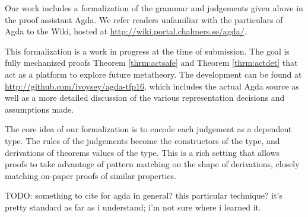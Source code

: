 Our work includes a formalization of the grammar and judgements given above
in the proof assistant Agda. We refer readers unfamiliar with the
particulars of Agda to the Wiki, hosted
at \url{http://wiki.portal.chalmers.se/agda/}.

This formalization is a work in progress at the time of submission. The
goal is fully mechanized proofs Theorem \ref{thrm:actsafe} and
Theorem \ref{thrm:actdet} that act as a platform to explore future
metatheory. The development can be found at
\url{http://github.com/ivoysey/agda-tfp16}, which includes the actual Agda
source as well as a more detailed discussion of the various representation
decisions and assumptions made.

The core idea of our formalization is to encode each judgement as a
dependent type. The rules of the judgements become the constructors of the
type, and derivations of theorems values of the type. This is a rich
setting that allows proofs to take advantage of pattern matching on the
shape of derivations, closely matching on-paper proofs of similar
properties.


TODO: something to cite for agda in general? this particular technique?
it's pretty standard as far as i understand; i'm not sure where i learned
it.


